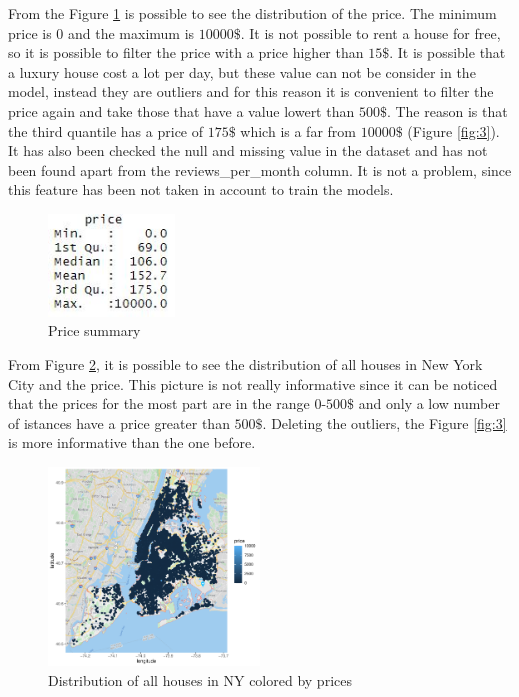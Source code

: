 \documentclass{FR16}
\begin{document}
From the Figure \ref{fig:1} is possible to see the distribution of the price. The minimum price is $0$ and the maximum is $10000\$$. It is not possible to rent a house for free, so it is possible to filter the price with a price higher than $15\$$. It is possible that a luxury house cost a lot per day, but these value can not be consider in the model, instead they are outliers and for this reason it is convenient to filter the price again and take those that have a value lowert than $500\$$. The reason is that the third quantile has a price of $175\$$ which is a far from $10000\$$ (Figure \ref{fig:3}). It has also been checked the null and missing value  in the dataset and has not been found apart from the reviews\_per\_month column. It is not a problem, since this feature has been not taken in account to train the models. 
\\
\begin{figure}[H]
\centering
\includegraphics[width=0.3\textwidth]{figures/figure1.jpg} 
\caption{\label{fig:1}Price summary}
\end{figure}
\noindent From Figure \ref{fig:2}, it is possible to see the distribution of all houses in New York City and the price. This picture is not really informative since it can be noticed that the prices for the most part are in the range $0$-$500\$$ and only a low number of istances have a price greater than $500\$$. Deleting the outliers, the Figure \ref{fig:3} is more informative than the one before.

\begin{figure}[H]
\centering
\includegraphics[width=0.5\textwidth]{figures/figure2.pdf} 
\caption{\label{fig:2}Distribution of all houses in NY colored by prices}
\end{figure}
\end{document}

